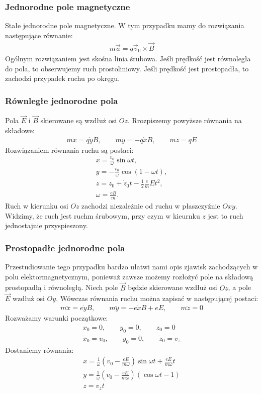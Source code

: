 \documentclass[paper=a4, fontsize=12pt]{scrartcl}
\begin{document}
\subsubsection{Jednorodne pole magnetyczne}
Stałe jednorodne pole magnetyczne. W tym przypadku mamy do rozwiązania następujące równanie:
\begin{align*}
	m\vec{a}=q\vec{v}_0\times\vec{B}
\end{align*}
Ogólnym rozwiązaniem jest skośna linia śrubowa. Jeśli prędkość jest równoległa do pola, to obserwujemy ruch prostoliniowy. Jeśli prędkość jest prostopadła, to zachodzi przypadek ruchu po okręgu.
\subsubsection{Równległe jednorodne pola} 
Pola $\vec{E}$ i $\vec{B}$ skierowane są wzdłuż osi $Oz$. Rrozpiszemy powyższe równania na składowe:
\begin{align*}
m\ddot{x}=q\dot{y}B,\qquad m\ddot{y}=-q\dot{x}B, \qquad m\ddot{z}=qE
\end{align*}
Rozwiązaniem równania ruchu są postaci:
\begin{align*}
x=\frac{v_0}{\omega}\sin\omega t,\\
y=-\frac{v_0}{\omega}\cos(1-\omega t),\\
z=z_0+\dot{z}_0t-\frac{1}{2}\frac{e}{m}Et^2,\\
\omega=\frac{eB}{m}.
\end{align*}
Ruch w kierunku osi $Oz$ zachodzi niezależnie od ruchu w płaszczyźnie $Oxy$. Widzimy, że ruch jest ruchm śrubowym, przy czym w kieurnku $z$ jest to ruch jednostajnie przyspieszony.
\subsubsection{Prostopadłe jednorodne pola}
Przestudiowanie tego przypadku bardzo ułatwi nami opis zjawisk zachodzących w polu elektormagnetycznym, ponieważ zawsze możemy rozłożyć pole na składową prostopadłą i równoległą.
Niech pole $\vec{B}$ będzie skierowane wzdłuż osi $Oz$, a pole $\vec{E}$ wzdłuż osi $Oy$. Wówczas równania ruchu można zapisać w następującej postaci:
\begin{align*}
m\ddot{x}=e\dot{y}B,\qquad m\ddot{y}=-e\dot{x}B+eE, \qquad m\ddot{z}=0
\end{align*}
Rozważamy warunki początkowe:
\begin{align*}
x_0=0,\qquad y_0=0,\qquad z_0=0\\
\dot{x}_0=v_0,\qquad\dot{y}_0=0,\qquad\dot{z}_0=v_z
\end{align*}
Dostaniemy równania:
\begin{align*}
x=\frac{1}{\omega}\left(v_0-\frac{eE}{m\omega}\right)\sin\omega t+\frac{eE}{m\omega}t\\
y=\frac{1}{\omega}\left(v_0-\frac{eE}{m\omega}\right)\left(\cos\omega t - 1\right)\\
z=v_zt
\end{align*}
\end{document}
